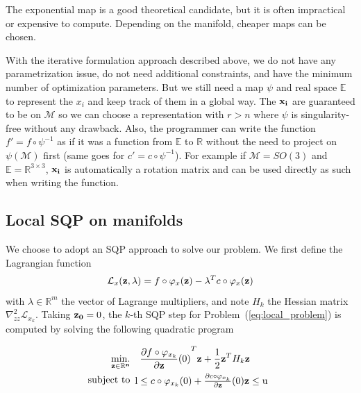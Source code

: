 The exponential map is a good theoretical candidate, but it is often impractical or expensive to compute.
Depending on the manifold, cheaper maps can be chosen.

With the iterative formulation approach described above, we do not have any parametrization issue, do not need additional constraints, and have the minimum number of optimization parameters.
But we still need a map $\psi$ and real space $\mathbb{E}$ to represent the $x_i$ and keep track of them in a global way.
The ${\bf x_i}$ are guaranteed to be on $\mathcal{M}$ so we can choose a representation with $r>n$ where $\psi$ is singularity-free without any drawback.
Also, the programmer can write the function $f' = f \circ \psi^{-1}$ as if it was a function from $\mathbb{E}$ to $\mathbb{R}$ without the need to project on $\psi(\mathcal{M})$ first (same goes for $c' = c \circ \psi^{-1}$).
For example if $\mathcal{M} = SO(3)$ and $\mathbb{E} = \mathbb{R}^{3\times 3}$, ${\bf x_i}$ is automatically a rotation matrix and can be used directly as such when writing the function.

\subsection{Local SQP on manifolds}
We choose to adopt an SQP approach to solve our problem.
We first define the Lagrangian function
\begin{equation}
  \mathcal{L}_x ({\bf z}, \lambda) = f\circ \varphi_x({\bf z}) - \lambda^T c \circ \varphi_x({\bf z})
\end{equation}
with $\lambda \in \mathbb{R}^m$ the vector of Lagrange multipliers, and note $H_k$ the Hessian matrix $\nabla_{zz}^2 \mathcal{L}_{x_k}$.
Taking ${\bf z_0} = 0$, the $k$-th SQP step for Problem~(\ref{eq:local_problem}) is computed by solving the following quadratic program

\begin{align}
	\label{eq:SQPStep}
  \operatorname*{min.}_{\bf z \in \mathbb{R}^n } & \quad {\frac{\partial f\circ \varphi_{x_k}}{\partial {\bf z}}(0)}^T {\bf z } + \frac{1}{2} {\bf z }^T H_k{\bf z }\\
  \text{subject to}&
  \begin{array}{lr}
    \text{l} \leq c\circ \varphi_{x_k}(0) + \frac{\partial c\circ \varphi_{x_k}}{\partial {\bf z}}(0) {\bf z }\leq \text{u}\\
  \end{array} \nonumber
\end{align}

